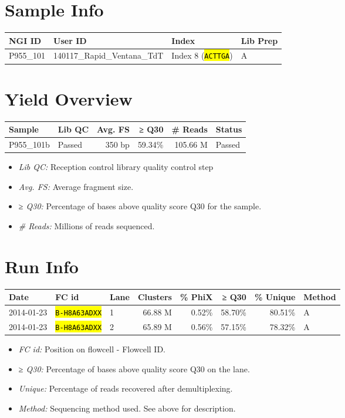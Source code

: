 \documentclass[12pt]{article}
\let\OldTexttt\texttt
\renewcommand{\texttt}[1]{\OldTexttt{\small\hl{#1}}}
\begin{document}
\section{Sample Info}\label{sample-info}

\begin{longtable}[c]{@{}llll@{}}
\toprule
NGI ID & User ID & Index & Lib Prep\tabularnewline
\midrule
\endhead
P955\_101 & 140117\_Rapid\_Ventana\_TdT & Index 8 (\texttt{ACTTGA}) &
A\tabularnewline
\bottomrule
\end{longtable}

\section{Yield Overview}\label{yield-overview}

\begin{longtable}[c]{@{}llrrrl@{}}
\toprule
Sample & Lib QC & Avg. FS & ≥ Q30 & \# Reads & Status\tabularnewline
\midrule
\endhead
P955\_101b & Passed & 350 bp & 59.34\% & 105.66 M &
Passed\tabularnewline
\bottomrule
\end{longtable}

\begin{itemize}
\itemsep1pt\parskip0pt
\item
  \emph{Lib QC:} Reception control library quality control step
\item
  \emph{Avg. FS:} Average fragment size.
\item
  \emph{≥ Q30:} Percentage of bases above quality score Q30 for the
  sample.
\item
  \emph{\# Reads:} Millions of reads sequenced.
\end{itemize}

\section{Run Info}\label{run-info}

\begin{longtable}[c]{@{}lllrrrrl@{}}
\toprule
Date & FC id & Lane & Clusters & \% PhiX & ≥ Q30 & \% Unique &
Method\tabularnewline
\midrule
\endhead
2014-01-23 & \texttt{B-H8A63ADXX} & 1 & 66.88 M & 0.52\% & 58.70\% &
80.51\% & A\tabularnewline
2014-01-23 & \texttt{B-H8A63ADXX} & 2 & 65.89 M & 0.56\% & 57.15\% &
78.32\% & A\tabularnewline
\bottomrule
\end{longtable}

\begin{itemize}
\itemsep1pt\parskip0pt
\item
  \emph{FC id:} Position on flowcell - Flowcell ID.
\item
  \emph{≥ Q30:} Percentage of bases above quality score Q30 on the lane.
\item
  \emph{Unique:} Percentage of reads recovered after demultiplexing.
\item
  \emph{Method:} Sequencing method used. See above for description.
\end{itemize}
\end{document}
